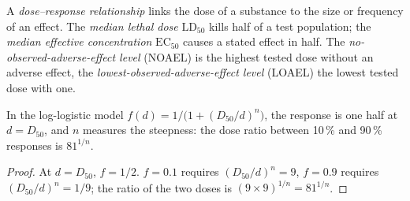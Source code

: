 \begin{definition}\label{def:b3:environmental-toxicology:dose}
A \emph{dose--response relationship} links
the dose of a substance to the size or frequency of an effect. The \emph{median
lethal dose} $\mathrm{LD_{50}}$ kills half of a test population; the
\emph{median effective concentration} $\mathrm{EC_{50}}$
causes a stated effect in half. The \emph{no-observed-adverse-effect
level} (NOAEL) is the highest tested dose
without an adverse effect, the \emph{lowest-observed-adverse-effect
level} (LOAEL) the lowest tested dose
with one.
\end{definition}

\begin{proposition}\label{prop:b3:environmental-toxicology:dose-response}
In the log-logistic model $f(d) = 1/\bigl(1 + (D_{50}/d)^n\bigr)$, the response is one half at $d = D_{50}$, and $n$
measures the steepness: the dose ratio between 10\,\% and 90\,\% responses is $81^{1/n}$.
\end{proposition}

\begin{proof}
At $d = D_{50}$, $f = 1/2$. $f = 0.1$ requires $(D_{50}/d)^n = 9$, $f = 0.9$ requires $(D_{50}/d)^n = 1/9$; the ratio of the two doses
is $(9 \times 9)^{1/n} = 81^{1/n}$.
\end{proof}

